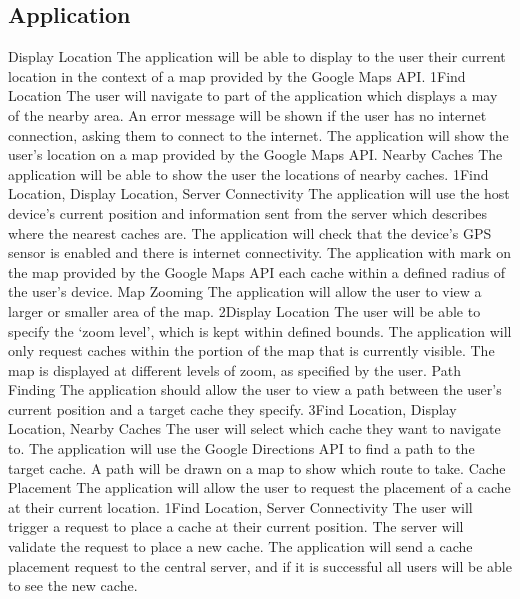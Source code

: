 	\subsection{Application}
		\funcreq
			{Display Location}
			{The application will be able to display to the user their current 
			location in the context of a map provided by the Google Maps API.}
			{1}{Find Location}
			{The user will navigate to part of the application which displays 
			a may of the nearby area.}
			{An error message will be shown if the user has no internet 
			connection, asking them to connect to the internet.}
			{The application will show the user's location on a map provided 
			by the Google Maps API.}
		\funcreq
			{Nearby Caches}
			{The application will be able to show the user the locations of 
			nearby caches.}
			{1}{Find Location, Display Location, Server Connectivity}
			{The application will use the host device's current position and 
			information sent from the server which describes where the nearest 
			caches are.}
			{The application will check that the device's GPS sensor is 
			enabled and there is internet connectivity.}
			{The application with mark on the map provided by the Google Maps 
			API each cache within a defined radius of the user's device.}
		\funcreq
			{Map Zooming}
			{The application will allow the user to view a larger or smaller 
			area of the map.}
			{2}{Display Location}
			{The user will be able to specify the `zoom level', which is kept 
			within defined bounds.}
			{The application will only request caches within the portion of 
			the map that is currently visible.}
			{The map is displayed at different levels of zoom, as specified by 
			the user.}
		\funcreq
			{Path Finding}
			{The application should allow the user to view a path between the 
			user's current position and a target cache they specify.}
			{3}{Find Location, Display Location, Nearby Caches}
			{The user will select which cache they want to navigate to.}
			{The application will use the Google Directions API to find a path 
			to the target cache.}
			{A path will be drawn on a map to show which route to take.}
		\funcreq
			{Cache Placement}
			{The application will allow the user to request the placement of a 
			cache at their current location.}
			{1}{Find Location, Server Connectivity}
			{The user will trigger a request to place a cache at their current 
			position.}
			{The server will validate the request to place a new cache.}
			{The application will send a cache placement request to the 
			central server, and if it is successful all users will be able to 
			see the new cache.}

\renewcommand{\arraystretch}{1}
